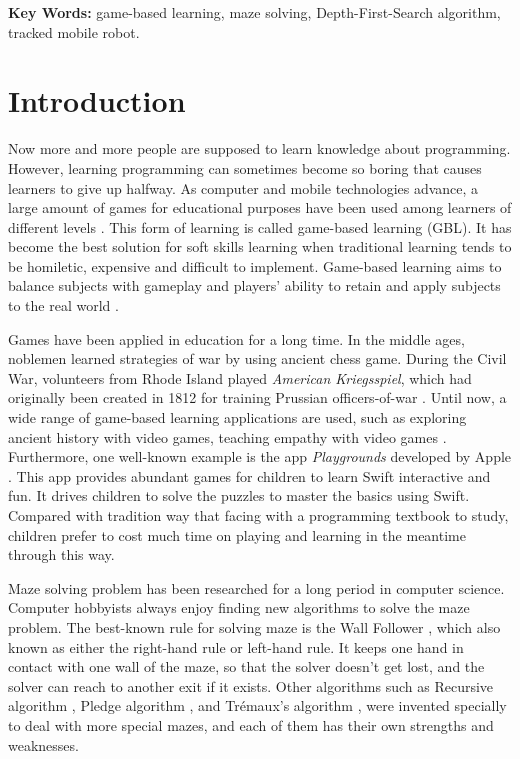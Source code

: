 \documentclass[11pt,times,oneside,openright,hardcopy]{eeereport}
\begin{document}
\textbf{Key Words:} game-based learning, maze solving, Depth-First-Search algorithm, tracked mobile robot.

\mainmatter
{}

\chapter{Introduction}\label{cpt:spec}
Now more and more people are supposed to learn knowledge about programming. However, learning programming can sometimes become so boring that causes learners to give up halfway.
As computer and mobile technologies advance, a large amount of games for educational purposes have been used among learners of different levels \cite{Proulx:2018fr}. 
This form of learning is called game-based learning (GBL). It has become the best solution for soft skills learning when traditional learning tends to be homiletic, expensive and difficult to implement.
Game-based learning aims to balance subjects with gameplay and players' ability to retain and apply subjects to the real world \cite{Ifenthaler:2012tn}. 

Games have been applied in education for a long time. In the middle ages, noblemen learned strategies of war by using ancient chess game. During the Civil War, volunteers from Rhode Island played \emph{American Kriegsspiel}, which had originally been created in 1812 for training Prussian officers-of-war \cite{Felicia:2014wt}.
Until now, a wide range of game-based learning applications are used, such as exploring ancient history with video games, teaching empathy with video games \cite{Prensky:2007wt}. Furthermore, one well-known example is the app \emph{Playgrounds} developed by Apple \cite{Tveit:2016ul}. 
This app provides abundant games for children to learn Swift interactive and fun. It drives children to solve the puzzles to master the basics using Swift. Compared with tradition way that facing with a programming textbook to study, children prefer to cost much time on playing and learning in the meantime through this way.

Maze solving problem has been researched for a long period in computer science. Computer hobbyists always enjoy finding new algorithms to solve the maze problem. The best-known rule for solving maze is the Wall Follower \cite{Ao:2008uy}, which also known as either the right-hand rule or left-hand rule.
It keeps one hand in contact with one wall of the maze, so that the solver doesn't get lost, and the solver can reach to another exit if it exists. Other algorithms such as Recursive algorithm \cite{BullenIV:2009vv}, Pledge algorithm \cite{Klein:2011hi}, and Trémaux's algorithm \cite{Anonymous:2007ch}, 
were invented specially to deal with more special mazes, and each of them has their own strengths and weaknesses.
\end{document}
